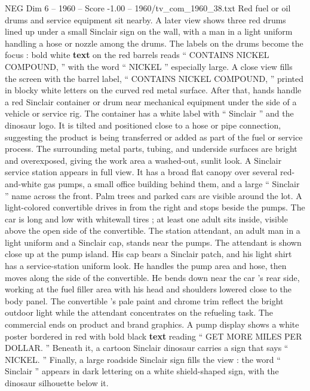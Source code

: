 \begin{textsample}{NEG Dim 6 – 1960 – Score -1.00 – 1960/tv\_com\_1960\_38.txt}
Red fuel or oil drums and service equipment sit nearby.
A later view shows three red drums lined up under a small Sinclair sign on the wall, with a man in a light uniform handling a hose or nozzle among the drums.
The labels on the drums become the focus : bold white \textbf{text} on the red barrels reads “ CONTAINS NICKEL COMPOUND, ” with the word “ NICKEL ” especially large.
A close view fills the screen with the barrel label, “ CONTAINS NICKEL COMPOUND, ” printed in blocky white letters on the curved red metal surface.
After that, hands handle a red Sinclair container or drum near mechanical equipment under the side of a vehicle or service rig.
The container has a white label with “ Sinclair ” and the dinosaur logo.
It is tilted and positioned close to a hose or pipe connection, suggesting the product is being transferred or added as part of the fuel or service process.
The surrounding metal parts, tubing, and underside surfaces are bright and overexposed, giving the work area a washed-out, sunlit look.
A Sinclair service station appears in full view.
It has a broad flat canopy over several red-and-white gas pumps, a small office building behind them, and a large “ Sinclair ” name across the front.
Palm trees and parked cars are visible around the lot.
A light-colored convertible drives in from the right and stops beside the pumps.
The car is long and low with whitewall tires ; at least one adult sits inside, visible above the open side of the convertible.
The station attendant, an adult man in a light uniform and a Sinclair cap, stands near the pumps.
The attendant is shown close up at the pump island.
His cap bears a Sinclair patch, and his light shirt has a service-station uniform look.
He handles the pump area and hose, then moves along the side of the convertible.
He bends down near the car ’s rear side, working at the fuel filler area with his head and shoulders lowered close to the body panel.
The convertible ’s pale paint and chrome trim reflect the bright outdoor light while the attendant concentrates on the refueling task.
The commercial ends on product and brand graphics.
A pump display shows a white poster bordered in red with bold black \textbf{text} reading “ GET MORE MILES PER DOLLAR. ” Beneath it, a cartoon Sinclair dinosaur carries a sign that says “ NICKEL. ” Finally, a large roadside Sinclair sign fills the view : the word “ Sinclair ” appears in dark lettering on a white shield-shaped sign, with the dinosaur silhouette below it.

\end{textsample}

